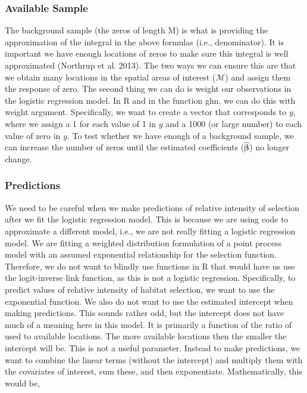\documentclass[12pt]{article}
\begin{document}
\subsubsection{Available Sample}
The background sample (the zeros of length M) is what is providing the approximation of the integral in the above formulas (i.e., denominator). It is important we have enough locations of zeros to make sure this integral is well approximated (Northrup et al. 2013). The two ways we can ensure this are that we obtain many locations in the spatial areas of interest ($\mathcal{M}$) and assign them the response of zero. The second thing we can do is weight our observations in the logistic regression model. In R and in the function glm, we can do this with weight argument. Specifically, we want to create a vector that corresponds to $y$, where we assign a 1 for each value of 1 in $y$ and a 1000 (or large number) to each value of zero in $y$. To test whether we have enough of a background sample, we can increase the number of zeros until the estimated coefficients ($\hat{\boldsymbol{\beta}}$) no longer change.

\subsubsection{Predictions}

We need to be careful when we make predictions of relative intensity of selection after we fit the logistic regression model. This is because we are using code to approximate a different model, i.e., we are not really fitting a logistic regression model. We are fitting a weighted distribution formulation of a point process model with an assumed exponential relationship for the selection function. Therefore, we do not want to blindly use functions in R that would have us use the logit-inverse link function, as this is not a logistic regression. Specifically, to predict values of relative intensity of habitat selection, we want to use the exponential function. We also do not want to use the estimated intercept when making predictions. This sounds rather odd, but the intercept does not have much of a meaning here in this model. It is primarily a function of the ratio of used to available locations. The more available locations then the smaller the intercept will be. This is not a useful parameter. Instead to make predictions, we want to combine the linear terms (without the intercept) and multiply them with the covariates of interest, sum these, and then exponentiate. Mathematically, this would be,
\end{document}
